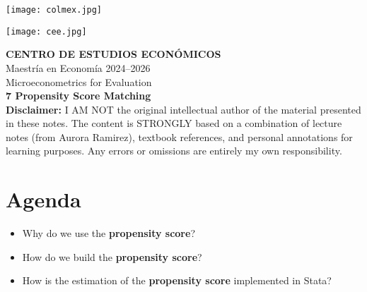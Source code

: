 \documentclass[12pt]{article}
\title{}
\author{}
\date{}
\begin{document}
\begin{titlepage}
    \vspace*{-1cm}
    \noindent
    \begin{minipage}[t]{0.49\textwidth}
        \texttt{[image: colmex.jpg]}
    \end{minipage}%
    \begin{minipage}[t]{0.49\textwidth}
        \raggedleft
        \texttt{[image: cee.jpg]}
    \end{minipage}

    \vspace*{2cm}

    \begin{center}
        \Huge \textbf{CENTRO DE ESTUDIOS ECONÓMICOS} \\[1.5em]
        \Large Maestría en Economía 2024--2026 \\[2em]
        \Large Microeconometrics for Evaluation \\[3em]
        \LARGE \textbf{7 Propensity Score Matching} \\[3em]
        \large \textbf{Disclaimer:} I AM NOT the original intellectual author of the material presented in these notes. The content is STRONGLY based on a combination of lecture notes (from Aurora Ramirez), textbook references, and personal annotations for learning purposes. Any errors or omissions are entirely my own responsibility.\\[0.9em]
        
    \end{center}

    \vfill
\end{titlepage}

\newpage

\setcounter{secnumdepth}{2}
\setcounter{tocdepth}{4}
\tableofcontents

\newpage

\section*{\noindent\textbf{Agenda}}

\begin{itemize}
    \item Why do we use the \textbf{propensity score}?
    \item How do we build the \textbf{propensity score}?
    \item How is the estimation of the \textbf{propensity score} implemented in Stata?
\end{itemize}
\end{document}
